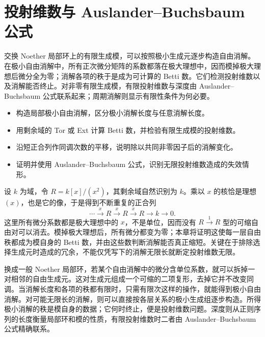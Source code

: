 
\chapter{投射维数与 Auslander–Buchsbaum 公式}
\label{b3:ch:17}

\begin{chapterabstract}
	交换 Noether 局部环上的有限生成模，可以按照极小生成元逐步构造自由消解。在极小自由消解中，所有正次微分矩阵的系数都落在极大理想中，因而模掉极大理想后微分全为零；消解各项的秩于是成为可计算的 Betti 数。它们检测投射维数以及消解能否终止。对非零有限生成模，有限投射维数与深度由 Auslander–Buchsbaum 公式联系起来；周期消解则显示有限性条件为何必要。
\end{chapterabstract}

\begin{learninggoals}
	\begin{itemize}
		\item 构造局部极小自由消解，区分极小消解长度与任意消解长度。
		\item 用剩余域的 Tor 或 Ext 计算 Betti 数，并检验有限生成模的投射维数。
		\item 沿短正合列作同调次数的平移，说明除以共同非零因子后的消解变化。
		\item 证明并使用 Auslander–Buchsbaum 公式，识别无限投射维数造成的失效情形。
	\end{itemize}
\end{learninggoals}

设 \(k\) 为域，令 \(R=k[x]/(x^2)\)，其剩余域自然识别为 \(k\)。乘以 \(x\) 的核恰是理想 \((x)\)，也是它的像，于是得到不断重复的正合列
\[
	\cdots\xrightarrow{\,x\,}R\xrightarrow{\,x\,}R\xrightarrow{\,x\,}R\longrightarrow k\longrightarrow0.
\]
这里所有微分系数都是极大理想中的 \(x\)，不是单位，因而没有 \(R\xrightarrow{1}R\) 型的可缩自由对可以消去。模掉极大理想后，所有微分都变为零；本章将证明这使每一层自由秩都成为模自身的 Betti 数，并由这些数判断消解能否真正缩短。关键在于排除选择生成元时造成的冗余，不能仅凭写下的消解无限长就断定投射维数无限。

\ProseParagraphBreak

换成一般 Noether 局部环，若某个自由消解中的微分含单位系数，就可以拆掉一对相邻的自由生成元。这对生成元组成一个可缩的二项复形，去掉它并不改变同调。当消解长度和各项的秩都有限时，只需有限次这样的操作，就能得到极小自由消解。对可能无限长的消解，则可以直接按各层关系的极小生成组逐步构造。所得极小消解的秩是模自身的数据；它何时终止，便是投射维数问题。深度则从正则序列的长度衡量局部环和模的性质，有限投射维数时二者由 Auslander–Buchsbaum 公式精确联系。


